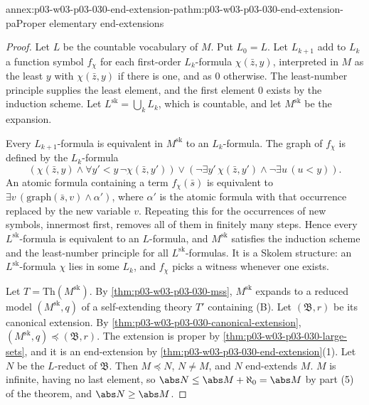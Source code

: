 \begin{annexitem}{annex:p03-w03-p03-030-end-extension-pa}{thm:p03-w03-p03-030-end-extension-pa}{Proper elementary end-extensions}
\begin{proof}
Let \(L\) be the countable vocabulary of \(M\).  Put \(L_0=L\).  Let
\(L_{k+1}\) add to \(L_k\) a function symbol \(f_\chi\) for each first-order
\(L_k\)-formula \(\chi(\bar z,y)\), interpreted in \(M\) as the least \(y\)
with \(\chi(\bar z,y)\) if there is one, and as \(0\) otherwise.  The
least-number principle supplies the least element, and the first element
\(0\) exists by the induction scheme.  Let \(L^{\mathrm{sk}}=\bigcup_kL_k\),
which is countable, and let \(M^{\mathrm{sk}}\) be the expansion.

Every \(L_{k+1}\)-formula is equivalent in \(M^{\mathrm{sk}}\) to an
\(L_k\)-formula.  The graph of \(f_\chi\) is defined by the \(L_k\)-formula
\[
 (\chi(\bar z,y)\wedge\forall y'<y\,\neg\chi(\bar z,y'))\vee
 (\neg\exists y'\,\chi(\bar z,y')\wedge\neg\exists u\,(u<y)).
\]
An atomic formula containing a term \(f_\chi(\bar s)\) is equivalent to
\(\exists v\,(\text{graph}(\bar s,v)\wedge\alpha')\), where \(\alpha'\) is the
atomic formula with that occurrence replaced by the new variable \(v\).
Repeating this for the occurrences of new symbols, innermost first, removes
all of them in finitely many steps.  Hence every \(L^{\mathrm{sk}}\)-formula
is equivalent to an \(L\)-formula, and \(M^{\mathrm{sk}}\) satisfies the
induction scheme and the least-number principle for all
\(L^{\mathrm{sk}}\)-formulas.  It is a Skolem structure: an
\(L^{\mathrm{sk}}\)-formula \(\chi\) lies in some \(L_k\), and \(f_\chi\) picks
a witness whenever one exists.

Let \(T=\mathrm{Th}(M^{\mathrm{sk}})\).  By
\cref{thm:p03-w03-p03-030-mss}, \(M^{\mathrm{sk}}\) expands to a reduced model
\((M^{\mathrm{sk}},q)\) of a self-extending theory \(T'\) containing (B).
Let \((\mathfrak B,r)\) be its canonical extension.  By
\cref{thm:p03-w03-p03-030-canonical-extension},
\((M^{\mathrm{sk}},q)\preccurlyeq(\mathfrak B,r)\).  The extension is proper
by \cref{thm:p03-w03-p03-030-large-sets}, and it is an end-extension by
\cref{thm:p03-w03-p03-030-end-extension}(1).  Let \(N\) be the \(L\)-reduct of
\(\mathfrak B\).  Then \(M\preccurlyeq N\), \(N\ne M\), and \(N\) end-extends
\(M\).  \(M\) is infinite, having no last element, so \(\abs
N\le\abs M+\aleph_0=\abs M\) by part (5) of the theorem, and \(\abs N\ge\abs
M\).
\end{proof}
\end{annexitem}


